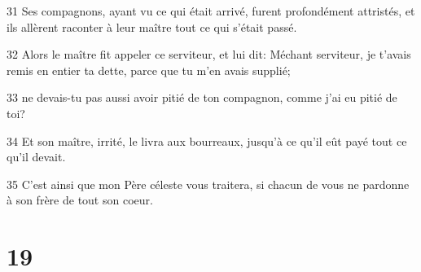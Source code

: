 \par 31 Ses compagnons, ayant vu ce qui était arrivé, furent profondément attristés, et ils allèrent raconter à leur maître tout ce qui s'était passé.
\par 32 Alors le maître fit appeler ce serviteur, et lui dit: Méchant serviteur, je t'avais remis en entier ta dette, parce que tu m'en avais supplié;
\par 33 ne devais-tu pas aussi avoir pitié de ton compagnon, comme j'ai eu pitié de toi?
\par 34 Et son maître, irrité, le livra aux bourreaux, jusqu'à ce qu'il eût payé tout ce qu'il devait.
\par 35 C'est ainsi que mon Père céleste vous traitera, si chacun de vous ne pardonne à son frère de tout son coeur.

\chapter{19}

